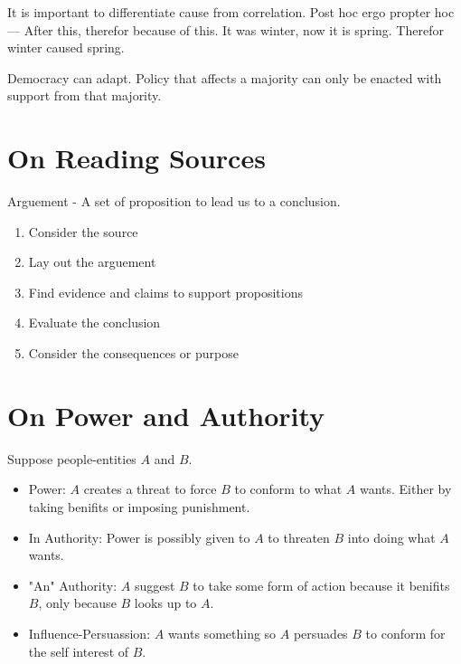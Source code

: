 \documentclass{article}
\begin{document}
It is important to differentiate cause from correlation. Post hoc ergo propter hoc --- After this, therefor because of this. It was winter, now it is spring. Therefor winter caused spring.

Democracy can adapt. Policy that affects a majority can only be enacted with support from that majority.

\section{On Reading Sources}
Arguement - A set of proposition to lead us to a conclusion.

\begin{enumerate}
  \item Consider the source
  \item Lay out the arguement
  \item Find evidence and claims to support propositions
  \item Evaluate the conclusion
  \item Consider the consequences or purpose
\end{enumerate}

\section{On Power and Authority}
Suppose people-entities $A$ and $B$.

\centering
{}
\raggedright

\begin{itemize}
  \item Power: $A$ creates a threat to force $B$ to conform to what $A$ wants. Either by taking benifits or imposing punishment.
  \item In Authority: Power is possibly given to $A$ to threaten $B$ into doing what $A$ wants.
  \item "An" Authority: $A$ suggest $B$ to take some form of action because it benifits $B$, only because $B$ looks up to $A$.
  \item Influence-Persuassion: $A$ wants something so $A$ persuades $B$ to conform for the self interest of $B$.
\end{itemize}
\end{document}
